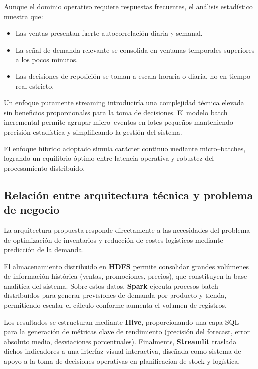 \documentclass[12pt,a4paper]{article}
\begin{document}
	Aunque el dominio operativo requiere respuestas frecuentes, el análisis estadístico muestra que:
	
	\begin{itemize}
		\item Las ventas presentan fuerte autocorrelación diaria y semanal.
		\item La señal de demanda relevante se consolida en ventanas temporales superiores a los pocos minutos.
		\item Las decisiones de reposición se toman a escala horaria o diaria, no en tiempo real estricto.
	\end{itemize}
	
	Un enfoque puramente streaming introduciría una complejidad técnica elevada sin beneficios proporcionales para la toma de decisiones. El modelo batch incremental permite agrupar micro–eventos en lotes pequeños manteniendo precisión estadística y simplificando la gestión del sistema.
	
	El enfoque híbrido adoptado simula carácter continuo mediante micro–batches, logrando un equilibrio óptimo entre latencia operativa y robustez del procesamiento distribuido.
	
	\subsection{Relación entre arquitectura técnica y problema de negocio}
	
	La arquitectura propuesta responde directamente a las necesidades del problema de optimización de inventarios y reducción de costes logísticos mediante predicción de la demanda.
	
	El almacenamiento distribuido en \textbf{HDFS} permite consolidar grandes volúmenes de información histórica (ventas, promociones, precios), que constituyen la base analítica del sistema. Sobre estos datos, \textbf{Spark} ejecuta procesos batch distribuidos para generar previsiones de demanda por producto y tienda, permitiendo escalar el cálculo conforme aumenta el volumen de registros.
	
	Los resultados se estructuran mediante \textbf{Hive}, proporcionando una capa SQL para la generación de métricas clave de rendimiento (precisión del forecast, error absoluto medio, desviaciones porcentuales). Finalmente, \textbf{Streamlit} traslada dichos indicadores a una interfaz visual interactiva, diseñada como sistema de apoyo a la toma de decisiones operativas en planificación de stock y logística.
	
\end{document}
